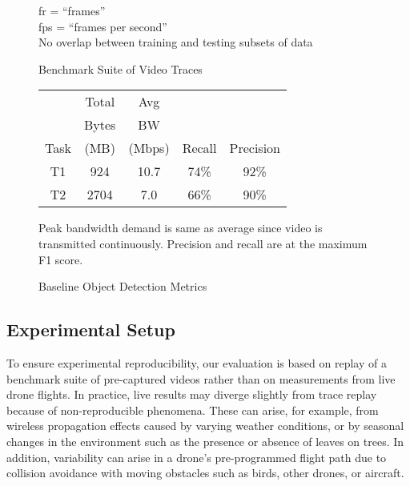 \begin{figure}
\begin{tabular}{|p{1cm}|p{2.5cm}|p{2.5cm}|p{2.5cm}|p{2.5cm}|p{2.5cm}|}
\hline
\end{tabular}
\vspace{0.1in}
\begin{captiontext}
fr = ``frames''\\
fps = ``frames per second''\\
No overlap between training and testing subsets of data
\end{captiontext}
\caption{Benchmark Suite of Video Traces}
\label{fig:benchmarksuite}
\end{figure}

\begin{figure}
\centering
\begin{tabular}{|c|c|c|c|c|}
\hline
     & Total & Avg & & \\ 
     & Bytes & BW & & \\ 
Task & (MB) & (Mbps) & Recall & Precision \\ 

\hline
T1 & \phantom{0}924 & 10.7 & 74\% & 92\%\\ 
\hline
T2 & 2704 & \phantom{0}7.0 & 66\% & 90\%\\ 
\hline
\end{tabular}
\vspace{0.2in}
\begin{captiontext}
Peak bandwidth demand is same as average since video is transmitted
continuously. Precision and recall are at the maximum F1 score.
\end{captiontext}
\caption{Baseline Object Detection Metrics}
\label{fig:baseline}
\end{figure}

\subsection{Experimental Setup}
\label{sec:dumbdrone-setup}

To ensure experimental reproducibility, our evaluation is based on
replay of a benchmark suite of pre-captured videos rather than on
measurements from live drone flights.  In practice, live results may
diverge slightly from trace replay because of non-reproducible
phenomena.  These can arise, for example, from wireless propagation
effects caused by varying weather conditions, or by seasonal changes
in the environment such as the presence or absence of leaves on trees.
In addition, variability can arise in a  drone's pre-programmed flight
path due to collision avoidance with moving obstacles such as birds,
other drones, or aircraft.

